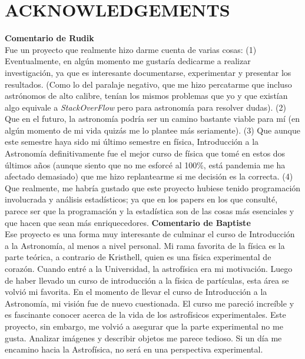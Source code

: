 \section*{ACKNOWLEDGEMENTS}\label{sec:acknow}

\textbf{Comentario de Rudik}\\
\indent Fue un proyecto que realmente hizo darme cuenta de varias cosas: (1) Eventualmente, en algún momento me gustaría dedicarme a realizar investigación, ya que es interesante documentarse, experimentar y presentar los resultados. (Como lo del paralaje negativo, que me hizo percatarme que incluso astrónomos de alto calibre, tenían los mismos problemas que yo y que existían algo equivale a \textit{StackOverFlow} pero para astronomía para resolver dudas). (2) Que en el futuro, la astronomía podría ser un camino bastante viable para mí (en algún momento de mi vida quizás me lo plantee más seriamente). (3) Que aunque este semestre haya sido mi último semestre en física, Introducción a la Astronomía definitivamente fue el mejor curso de física que tomé en estos dos últimos años (aunque siento que no me esforcé al 100\%, está pandemia me ha afectado demasiado) que me hizo replantearme si me decisión es la correcta. (4) Que realmente, me habría gustado que este proyecto hubiese tenido programación involucrada y análisis estadísticos; ya que en los papers en los que consulté, parece ser que la programación y la estadística son de las cosas más esenciales y que hacen que sean más enriquecedores.     \newline
\newline
\indent\textbf{Comentario de Baptiste}\\
Ese proyecto es una forma muy interesante de culminar el curso de Introducción a la Astronomía, al menos a nivel personal. Mi rama favorita de la física es la parte teórica, a contrario de Kristhell, quien es una física experimental de corazón. Cuando entré a la Universidad, la astrofísica era mi motivación. Luego de haber llevado un curso de introducción a la física de partículas, esta área se volvió mi favorita. En el momento de llevar el curso de Introducción a la Astronomía, mi visión fue de nuevo cuestionada. El curso me pareció increíble y es fascinante conocer acerca de la vida de los astrofísicos experimentales. Este proyecto, sin embargo, me volvió a asegurar que la parte experimental no me gusta. Analizar imágenes y describir objetos me parece tedioso. Si un día me encamino hacia la Astrofísica, no será en una perspectiva experimental.

